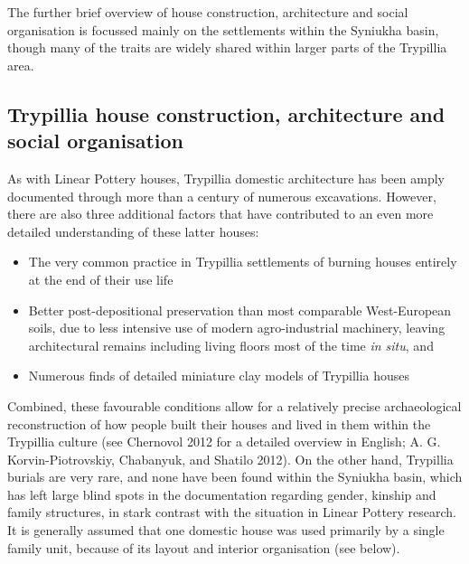 \documentclass[
  12pt,
  a4paper, twoside]{book}
\begin{document}
The further brief overview of house construction, architecture and social organisation is focussed mainly on the settlements within the Syniukha basin, though many of the traits are widely shared within larger parts of the Trypillia area.

\hypertarget{trypillia-house-construction-architecture-and-social-organisation}{%
\subsection{Trypillia house construction, architecture and social organisation}\label{trypillia-house-construction-architecture-and-social-organisation}}

As with Linear Pottery houses, Trypillia domestic architecture has been amply documented through more than a century of numerous excavations. However, there are also three additional factors that have contributed to an even more detailed understanding of these latter houses:

\begin{itemize}
\item
  The very common practice in Trypillia settlements of burning houses entirely at the end of their use life
\item
  Better post-depositional preservation than most comparable West-European soils, due to less intensive use of modern agro-industrial machinery, leaving architectural remains including living floors most of the time \emph{in situ}, and
\item
  Numerous finds of detailed miniature clay models of Trypillia houses
\end{itemize}

Combined, these favourable conditions allow for a relatively precise archaeological reconstruction of how people built their houses and lived in them within the Trypillia culture (see Chernovol 2012 for a detailed overview in English; A. G. Korvin-Piotrovskiy, Chabanyuk, and Shatilo 2012). On the other hand, Trypillia burials are very rare, and none have been found within the Syniukha basin, which has left large blind spots in the documentation regarding gender, kinship and family structures, in stark contrast with the situation in Linear Pottery research. It is generally assumed that one domestic house was used primarily by a single family unit, because of its layout and interior organisation (see below).
\end{document}
